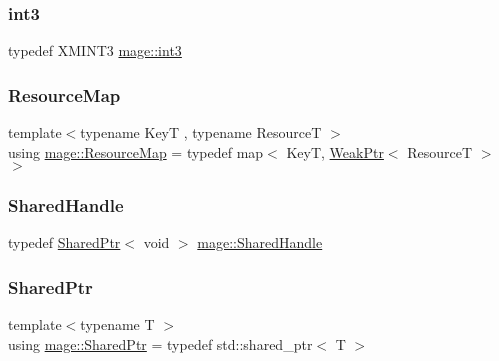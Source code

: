 \hypertarget{namespacemage_a80c7f9de83dfbbd55bbf339dbcbd99cc}{}\label{namespacemage_a80c7f9de83dfbbd55bbf339dbcbd99cc} 
\subsubsection{\texorpdfstring{int3}{int3}}
{\footnotesize\ttfamily typedef X\+M\+I\+N\+T3 \hyperlink{namespacemage_a80c7f9de83dfbbd55bbf339dbcbd99cc}{mage\+::int3}}

\hypertarget{namespacemage_a0b0a087ad59dd4aa0b4b538d8caec216}{}\label{namespacemage_a0b0a087ad59dd4aa0b4b538d8caec216} 
\subsubsection{\texorpdfstring{Resource\+Map}{ResourceMap}}
{\footnotesize\ttfamily template$<$typename KeyT , typename ResourceT $>$ \\
using \hyperlink{namespacemage_a0b0a087ad59dd4aa0b4b538d8caec216}{mage\+::\+Resource\+Map} = typedef map$<$ KeyT, \hyperlink{namespacemage_aa159a63c0d58464bdf32dfe419dd5dc1}{Weak\+Ptr}$<$ ResourceT $>$ $>$}

\hypertarget{namespacemage_ab892828913d6129acf71e0cec60467e5}{}\label{namespacemage_ab892828913d6129acf71e0cec60467e5} 
\subsubsection{\texorpdfstring{Shared\+Handle}{SharedHandle}}
{\footnotesize\ttfamily typedef \hyperlink{namespacemage_a1e01ae66713838a7a67d30e44c67703e}{Shared\+Ptr}$<$ void $>$ \hyperlink{namespacemage_ab892828913d6129acf71e0cec60467e5}{mage\+::\+Shared\+Handle}}

\hypertarget{namespacemage_a1e01ae66713838a7a67d30e44c67703e}{}\label{namespacemage_a1e01ae66713838a7a67d30e44c67703e} 
\subsubsection{\texorpdfstring{Shared\+Ptr}{SharedPtr}}
{\footnotesize\ttfamily template$<$typename T $>$ \\
using \hyperlink{namespacemage_a1e01ae66713838a7a67d30e44c67703e}{mage\+::\+Shared\+Ptr} = typedef std\+::shared\+\_\+ptr$<$ T $>$}

